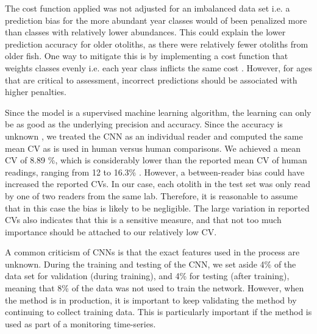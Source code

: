 \documentclass[10pt,letterpaper]{article}
\begin{document}
The cost function applied was not adjusted for an imbalanced data set i.e. a prediction bias for the more abundant year classes would of been penalized more than classes with relatively lower abundances. This could explain the lower prediction accuracy for older otoliths, as there were relatively fewer otoliths from older fish. One way to mitigate this is by implementing a cost function that weights classes evenly i.e. each year class inflicts the same cost \citep{shen2015deepcontour}. However, for ages that are critical to assessment, incorrect predictions should be associated with higher penalties. 

Since the model is a supervised machine learning algorithm, the learning
can only be as good as the underlying precision and accuracy. Since the 
accuracy is unknown \citep{albert2009towards}, we treated the CNN as an individual reader and computed the same mean CV as is used in human versus human comparisons. 
We achieved a mean CV of 8.89 \%, which is considerably lower than the reported mean CV of human readings, ranging from 12 to 16.3\% \citep{albert2009towards,albert2016growth}. 
However, a between-reader bias could have increased the reported CVs. In our case, each otolith in the test set was only read by one of two readers from the same lab. Therefore, it is reasonable to assume that in this case the bias is likely to be negligible. The large variation in reported CVs also indicates that this is a sensitive measure, and that not too much importance should be attached to our relatively low CV.


A common criticism of CNNs is that the exact features used in the process are unknown. During the training and testing of the CNN, we set aside 4\% of the data set for validation (during training), and 4\% for testing (after training), meaning that 8\% of the data was not used to train the network. However, when the method is in production, it is important to keep validating the method by continuing to collect training data. This is particularly important if the method is used as part of a monitoring time-series.
\end{document}
